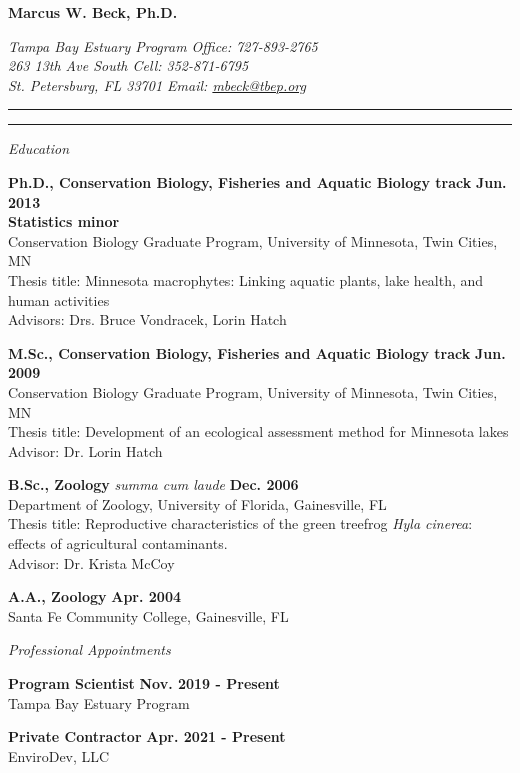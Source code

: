 \documentclass[letterpaper,12pt]{article}
\newcommand{\sectitle}[1]{\vspace{\baselineskip} \centerline{\large{\textit{#1}}}}
\begin{document}
\raggedright

\LARGE
\centerline{{\bf Marcus W. Beck, Ph.D.}}
\normalsize
\textit{Tampa Bay Estuary Program \hfill Office: 727-893-2765 \\
263 13th Ave South \hfill Cell: 352-871-6795 \\
St. Petersburg, FL 33701 \hfill Email: \href{mailto:mbeck@tbep.org}{mbeck@tbep.org}}
\vspace{4pt}
\hrule
\vspace{2pt}
\hrule
\vspace{4pt}

\small

\sectitle{Education}

{\bf Ph.D., Conservation Biology, Fisheries and Aquatic Biology track} \hfill {\bf Jun. 2013} \\
{\bf Statistics minor} \\
Conservation Biology Graduate Program, University of Minnesota, Twin Cities, MN \\
Thesis title: Minnesota macrophytes: Linking aquatic plants, lake health, and human activities \\
Advisors: Drs. Bruce Vondracek, Lorin Hatch

{\bf M.Sc., Conservation Biology, Fisheries and Aquatic Biology track} \hfill {\bf Jun. 2009} \\
Conservation Biology Graduate Program, University of Minnesota, Twin Cities, MN \\
Thesis title: Development of an ecological assessment method for Minnesota lakes\\
Advisor: Dr. Lorin Hatch

{\bf B.Sc., Zoology} \textit{summa cum laude} \hfill {\bf Dec. 2006} \\
Department of Zoology, University of Florida, Gainesville, FL \\
Thesis title: Reproductive characteristics of the green treefrog \textit{Hyla cinerea}: effects of agricultural contaminants. \\
Advisor: Dr. Krista McCoy

{\bf A.A., Zoology} \hfill {\bf Apr. 2004} \\
Santa Fe Community College, Gainesville, FL

\sectitle{Professional Appointments}

{\bf Program Scientist} \hfill {\bf Nov. 2019 - Present}\\
Tampa Bay Estuary Program

{\bf Private Contractor} \hfill {\bf Apr. 2021 - Present}\\
EnviroDev, LLC
\end{document}
